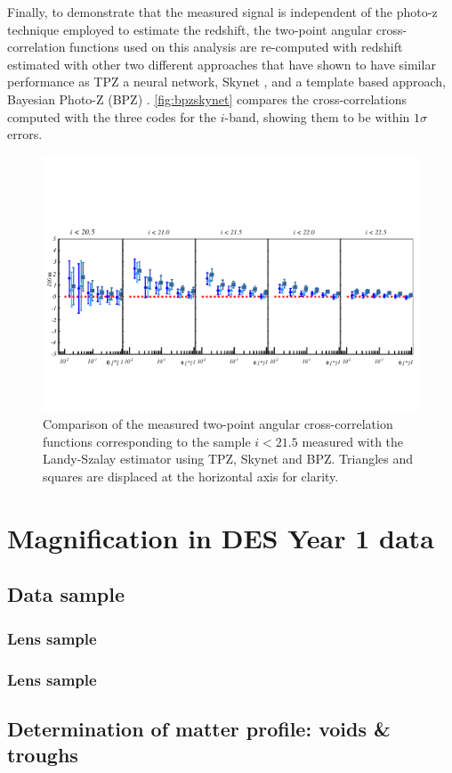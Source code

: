     Finally, to demonstrate that the measured signal is independent of the photo-z technique employed to estimate the redshift, the two-point angular cross-correlation functions used on this analysis are re-computed with redshift estimated with other two different approaches that have shown to have similar performance as TPZ \cite{2014MNRAS.445.1482S} a neural network, Skynet  \cite{2014MNRAS.441.1741G}, and a template based approach, Bayesian Photo-Z (BPZ) \cite{2000ApJ...536..571B}. \autoref{fig:bpzskynet} compares the cross-correlations computed with the three codes for the $i$-band, showing them to be within $1\sigma$ errors.
\begin{figure}
\includegraphics[width=\textwidth,trim={0 2.3cm 0 3.5cm},clip]{./figures/mag_i_photoz_comparison.pdf}
\caption{Comparison of the measured two-point angular cross-correlation functions corresponding to the sample $i<21.5$ measured with the Landy-Szalay estimator using TPZ, Skynet and BPZ. Triangles and squares are displaced at the horizontal axis for clarity.}
\label{fig:bpzskynet}
\end{figure}



\section{Magnification in DES Year 1 data}
\label{sec:y1data}
\subsection{Data sample}
\subsubsection{Lens sample}
\subsubsection{Lens sample}
\subsection{Determination of matter profile: voids \& troughs}
